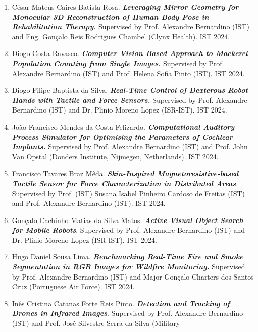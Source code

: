 \begin{enumerate}
  Bruno Miguel da Silva Cebola. \emph{\textbf{Comparative Analysis of
  Approaches to Perform Human Activity Recognition in Public
  Transportation Hubs.}} Supervised by Prof. Alexandre Bernardino (IST)
  and Eng. João Tiago Pinto de Almeida Dias Fonseca (Thales Portugal).
  IST 2024.
\item
  César Mateus Caires Batista Rosa. \emph{\textbf{Leveraging Mirror
  Geometry for Monocular 3D Reconstruction of Human Body Pose in
  Rehabilitation Therapy.}} Supervised by Prof. Alexandre Bernardino
  (IST) and Eng. Gonçalo Reis Rodrigues Chambel (Clynx Health). IST
  2024.
\item
  Diogo Costa Ravasco. \emph{\textbf{Computer Vision Based Approach to
  Mackerel Population Counting from Single Images.}} Supervised by Prof.
  Alexandre Bernardino (IST) and Prof. Helena Sofia Pinto (IST). IST
  2024.
\item
  Diogo Filipe Baptista da Silva. \emph{\textbf{Real-Time Control of
  Dexterous Robot Hands with Tactile and Force Sensors.}} Supervised by
  Prof. Alexandre Bernardino (IST) and Dr. Plinio Moreno Lopez
  (ISR-IST). IST 2024.
\item
  João Francisco Mendes da Costa Felizardo. \emph{\textbf{Computational
  Auditory Process Simulator for Optimising the Parameters of Cochlear
  Implants.}} Supervised by Prof. Alexandre Bernardino (IST) and Prof.
  John Van Opstal (Donders Institute, Nijmegen, Netherlands). IST 2024.
\item
  Francisco Tavares Braz Mêda. \emph{\textbf{Skin-Inspired
  Magnetoresistive-based Tactile Sensor for Force Characterization in
  Distributed Areas}}. Supervised by Prof. (IST) Susana Isabel Pinheiro
  Cardoso de Freitas (IST) and Prof. Alexandre Bernardino (IST). IST
  2024.
\item
  Gonçalo Cachinho Matias da Silva Matos. \emph{\textbf{Active Visual
  Object Search for Mobile Robots}}. Supervised by Prof. Alexandre
  Bernardino (IST) and Dr. Plinio Moreno Lopez (ISR-IST). IST 2024.
\item
  Hugo Daniel Sousa Lima. \emph{\textbf{Benchmarking Real-Time Fire and
  Smoke Segmentation in RGB Images for Wildfire Monitoring.}} Supervised
  by Prof. Alexandre Bernardino (IST) and Major Gonçalo Charters dos
  Santos Cruz (Portuguese Air Force). IST 2024.
\item
  Inês Cristina Catanas Forte Reis Pinto. \emph{\textbf{Detection and
  Tracking of Drones in Infrared Images}}. Supervised by Prof. Alexandre
  Bernardino (IST) and Prof. José Silvestre Serra da Silva (Military

\end{enumerate}
